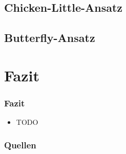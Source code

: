 \documentclass{beamer}
\begin{document}
	
	\subsection{Chicken-Little-Ansatz}
	
	
	\subsection{Butterfly-Ansatz}
	
	
	\section{Fazit}
	
	\begin{frame}
		\frametitle{Fazit}
		
		\begin{itemize}
			\item TODO %
		\end{itemize}
	\end{frame}
	
	
	
	\begin{frame}
		\frametitle{Quellen}
						
		
		
	\end{frame}
	
\end{document}
